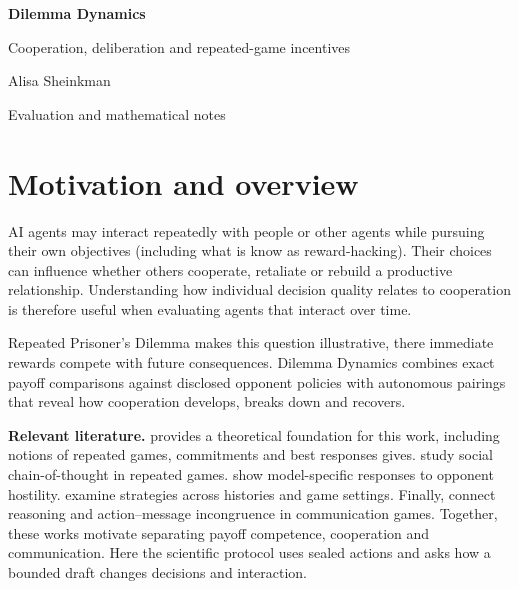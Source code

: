 \documentclass[11pt,a4paper]{article}
\begin{document}
\begin{center}
{\LARGE\bfseries Dilemma Dynamics}\par
{\large Cooperation, deliberation and repeated-game incentives}\par
\vspace{5pt}
Alisa Sheinkman\par
{\small Evaluation and mathematical notes}
\end{center}
\begin{abstract}
Does drafting before acting help an AI recognise when cooperation pays?
We compare Direct and bounded Draft procedures in Nemotron Nano and Super
across 7,104 repeated Prisoner's Dilemma episodes at temperatures 0 and 1.
Draft reduces average benchmark loss by 16.8--37.5\% across four planned comparisons, yet increases loss against
Tit-for-Tat and reduces model self-play cooperation. These results connect individual payoff decisions to the dynamics of reciprocity, and motivate experiments on
contingent planning and richer interactions.
\end{abstract}

\section{Motivation and overview}
AI agents may interact repeatedly with people or other agents while pursuing
their own objectives (including what is know as reward-hacking). Their choices can influence whether others cooperate,
retaliate or rebuild a productive relationship. Understanding how individual decision quality relates to cooperation is therefore useful when evaluating
agents that interact over time.

Repeated Prisoner's Dilemma makes this question illustrative, there immediate rewards
compete with future consequences. Dilemma Dynamics combines exact payoff comparisons against disclosed opponent policies with autonomous pairings that
reveal how cooperation develops, breaks down and recovers.

\textbf{Relevant literature.} \cite{rasmusen} provides a theoretical foundation for this work, including notions of repeated games, commitments
and best responses gives.
\cite{akata} study social chain-of-thought in repeated games.
\cite{fontana} show model-specific responses to opponent hostility.
\cite{pal} examine strategies across histories and game settings.
Finally,  \cite{taylor} connect reasoning and action--message incongruence in
communication games. Together, these works motivate separating payoff competence, cooperation and communication. 
Here the scientific protocol uses sealed actions and asks how a bounded draft changes decisions and interaction.
\end{document}
